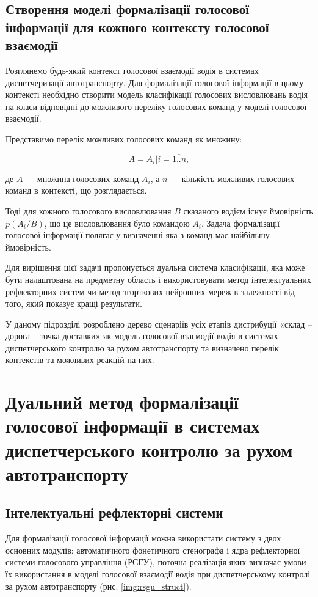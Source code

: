 \subsection{Створення моделі формалізації голосової інформації для кожного контексту голосової взаємодії}

Розглянемо будь-який контекст голосової взаємодії водія в системах диспетчеризації автотранспорту. Для формалізації голосової інформації в цьому контексті необхідно створити модель класифікації голосових висловлювань водія на класи відповідні до можливого переліку голосових команд у моделі голосової взаємодії.

Представимо перелік можливих голосових команд як множину:

\[
A = {A_i | i=\overline{1..n}},
\]

\noindent
де $A$ --- множина голосових команд $A_i$, а $n$ --- кількість можливих голосових команд в контексті, що розглядається.

Тоді для кожного голосового висловлювання $B$ сказаного водієм існує ймовірність $p(A_i/B)$, що це висловлювання було командою $A_i$. Задача формалізації голосової інформації полягає у визначенні яка з команд має найбільшу ймовірність.

Для вирішення цієї задачі пропонується дуальна система класифікації, яка може бути налаштована на предметну область і використовувати метод інтелектуальних рефлекторних систем чи метод згорткових нейронних мереж в залежності від того, який показує кращі результати. 

У даному підрозділі розроблено дерево сценаріїв усіх етапів дистрибуції «склад – дорога – точка доставки» як модель голосової взаємодії водія в системах диспетчерського контролю за рухом автотранспорту та визначено перелік контекстів та можливих реакцій на них.

\section{Дуальний метод формалізації голосової інформації в системах диспетчерського контролю за рухом автотранспорту} \label{sect3_4}

\subsection{Інтелектуальні рефлекторні системи}

Для формалізації голосової інформації можна використати систему з двох основних модулів: автоматичного фонетичного стенографа і ядра рефлекторної системи голосового управління (РСГУ), поточна реалізація яких визначає умови їх використання в моделі голосової взаємодії водія при диспетчерському контролі за рухом автотранспорту (рис. \ref{img:rsgu_struct}).

